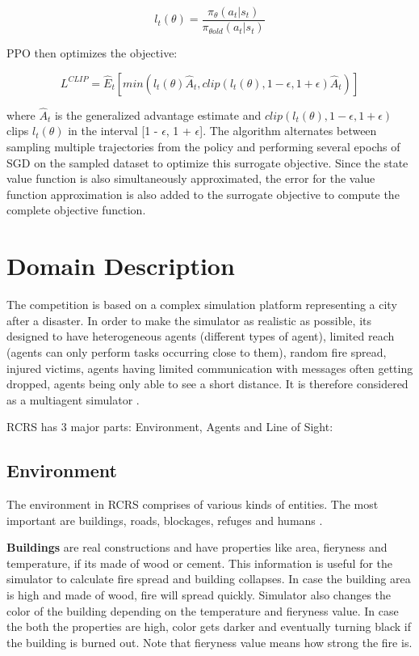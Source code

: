 \documentclass[12pt]{report}
\begin{document}
\[ l_t(\theta) = \frac{\pi_\theta(a_t | s_t)}{\pi_{\theta old}(a_t | s_t)}\]

\hfill \break
PPO then optimizes the objective: 

\[ L^{CLIP} = \hat{E}_t [min(l_t(\theta) \hat{A}_t, clip(l_t (\theta) , 1- \epsilon , 1+\epsilon)\hat{A}_t)] \]

\hfill \break
where $\hat{A}_t$ is the generalized advantage estimate and $clip(l_t (\theta) , 1- \epsilon , 1+\epsilon)$ clips $l_t(\theta)$ in the interval [1 - $\epsilon$, 1 + $\epsilon$]. The algorithm alternates between sampling multiple trajectories from the policy and performing several epochs of SGD on the
sampled dataset to optimize this surrogate objective. Since the state value function is also simultaneously approximated, the error for the value function approximation is also added to the surrogate
objective to compute the complete objective function. 

\section{Domain Description}

The competition is based on a complex simulation platform representing a city after a disaster. In order to make the simulator as realistic as possible, its designed to have heterogeneous agents (different types of agent), limited reach (agents can only perform tasks occurring close to them), random fire spread, injured victims, agents having limited communication with messages often getting dropped, agents being only able to see a short distance. It is therefore considered as a multiagent simulator \cite{Kitano}.  

RCRS has 3 major parts: Environment, Agents and Line of Sight:

\subsection{Environment}

The environment in RCRS comprises of various kinds of entities. The most important are buildings, roads, blockages, refuges and humans \cite{Morimoto}. 


\textbf{Buildings} are real constructions and have properties like area, fieryness and temperature, if its made of wood or cement. This information is useful for the simulator to calculate fire spread and building collapses. In case the building area is high and made of wood, fire will spread quickly. Simulator also changes the color of the building depending on the temperature and fieryness value. In case the both the properties are high, color gets darker and eventually turning black if the building is burned out. Note that fieryness value means how strong the fire is. 
\end{document}
